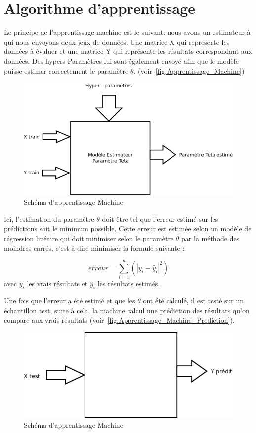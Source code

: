 \section{Algorithme d'apprentissage}


Le principe de l'apprentissage machine est le suivant: nous avons un estimateur à qui nous envoyons deux jeux de données. Une matrice X qui représente les données à évaluer et une matrice Y qui représente les résultats correspondant aux données. 
Des hypers-Paramètres lui sont également envoyé afin que le modèle puisse estimer correctement le paramètre $\theta$. 
(voir~\autoref{fig:Apprentissage_Machine})

\begin{figure}[htpb]
	\centering
	\includegraphics[scale = 0.25]{images/Diagramme1}
	\caption{Schéma d'apprentissage Machine}
	\label{fig:Apprentissage_Machine}
\end{figure}

Ici, l'estimation du paramètre $\theta$ doit être tel que l'erreur estimé sur les prédictions soit le minimum possible. 
Cette erreur est estimée selon un modèle de régression linéaire qui doit minimiser selon le paramètre $\theta$ par la méthode des moindres carrés, c'est-à-dire minimiser la formule suivante : 

\begin{equation}
erreur = \sum_{i=1}^{n} (|y_{i} - \hat{y}_{i}|^{2})
\end{equation}
avec $y_{i}$ les vrais résultats et $\hat{y}_{i}$ les résultats estimés. 

Une fois que l'erreur a été estimé et que les $\theta$ ont été calculé, il est testé sur un échantillon test, suite à cela, la machine calcul une prédiction des résultats qu'on compare aux vrais résultats (voir~\autoref{fig:Apprentissage_Machine_Prediction}). 

\begin{figure}[htpb]
	\centering
	\includegraphics[scale = 0.25]{images/App_Mach_Prediction}
	\caption{Schéma d'apprentissage Machine}
	\label{fig:Apprentissage_Machine_Prediction}
\end{figure}

